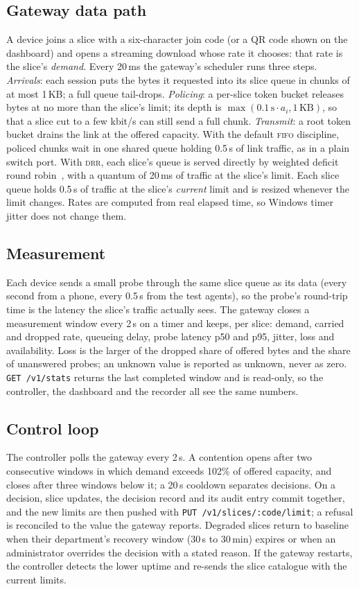 \documentclass[conference]{IEEEtran}
\begin{document}
\subsection{Gateway data path}
A device joins a slice with a six-character join code (or a QR code shown on the dashboard) and opens a streaming download whose rate it chooses: that rate is the slice's \emph{demand}. Every 20\,ms the gateway's scheduler runs three steps. \emph{Arrivals}: each session puts the bytes it requested into its slice queue in chunks of at most 1\,KB; a full queue tail-drops. \emph{Policing}: a per-slice token bucket releases bytes at no more than the slice's limit; its depth is $\max(0.1\,\text{s}\cdot a_i, 1\,\text{KB})$, so that a slice cut to a few kbit/s can still send a full chunk. \emph{Transmit}: a root token bucket drains the link at the offered capacity. With the default \textsc{fifo} discipline, policed chunks wait in one shared queue holding 0.5\,s of link traffic, as in a plain switch port. With \textsc{drr}, each slice's queue is served directly by weighted deficit round robin~\cite{shreedhar1996}, with a quantum of 20\,ms of traffic at the slice's limit. Each slice queue holds 0.5\,s of traffic at the slice's \emph{current} limit and is resized whenever the limit changes. Rates are computed from real elapsed time, so Windows timer jitter does not change them.

\subsection{Measurement}
Each device sends a small probe through the same slice queue as its data (every second from a phone, every 0.5\,s from the test agents), so the probe's round-trip time is the latency the slice's traffic actually sees. The gateway closes a measurement window every 2\,s on a timer and keeps, per slice: demand, carried and dropped rate, queueing delay, probe latency p50 and p95, jitter, loss and availability. Loss is the larger of the dropped share of offered bytes and the share of unanswered probes; an unknown value is reported as unknown, never as zero. \texttt{GET /v1/stats} returns the last completed window and is read-only, so the controller, the dashboard and the recorder all see the same numbers.

\subsection{Control loop}
The controller polls the gateway every 2\,s. A contention opens after two consecutive windows in which demand exceeds 102\% of offered capacity, and closes after three windows below it; a 20\,s cooldown separates decisions. On a decision, slice updates, the decision record and its audit entry commit together, and the new limits are then pushed with \texttt{PUT /v1/slices/:code/limit}; a refusal is reconciled to the value the gateway reports. Degraded slices return to baseline when their department's recovery window (30\,s to 30\,min) expires or when an administrator overrides the decision with a stated reason. If the gateway restarts, the controller detects the lower uptime and re-sends the slice catalogue with the current limits.
\end{document}

